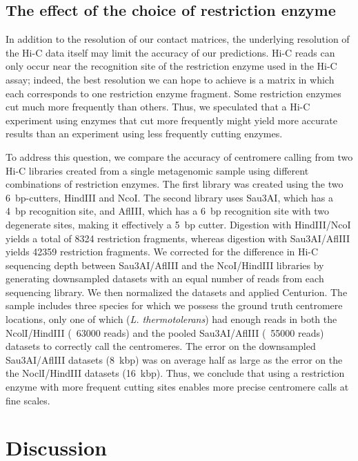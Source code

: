 \subsection{The effect of the choice of restriction enzyme}

In addition to the resolution of our contact matrices, the underlying
resolution of the Hi-C data itself may limit the accuracy of our predictions.
Hi-C reads can only occur near the recognition site of the restriction enzyme
used in the Hi-C assay; indeed, the best resolution we can hope to achieve is
a matrix in which each corresponds to one restriction enzyme fragment. Some
restriction enzymes cut much more frequently than others. Thus, we speculated
that a Hi-C experiment using enzymes that cut more frequently might yield more
accurate results than an experiment using less frequently cutting enzymes.

To address this question, we compare the accuracy of centromere calling from
two Hi-C libraries created from a single metagenomic sample using different
combinations of restriction enzymes. The first library was created using the
two 6~bp-cutters, HindIII and NcoI. The second library uses Sau3AI, which has a
4~bp recognition site, and AflIII, which has a 6~bp recognition site with two
degenerate sites, making it effectively a 5~bp cutter. Digestion with
HindIII/NcoI yields a total of 8324 restriction fragments, whereas digestion
with Sau3AI/AflIII yields 42359 restriction fragments. We corrected for the
difference in Hi-C sequencing depth between Sau3AI/AflIII and the NcoI/HindIII
libraries by generating downsampled datasets with an equal number of reads
from each sequencing library. We then normalized the datasets and applied
Centurion. The sample includes three species for which we possess the ground
truth centromere locations, only one of which (\textit{L. thermotolerans})
had enough reads in both the NcolI/HindIII (~63000 reads) and the pooled
Sau3AI/AflIII (~55000 reads) datasets to correctly call the centromeres. The
error on the downsampled Sau3AI/AflIII datasets (8~kbp) was on average half as
large as the error on the the NoclI/HindIII datasets (16~kbp). Thus, we
conclude that using a restriction enzyme with more frequent cutting sites
enables more precise centromere calls at fine scales.

\section{Discussion}


